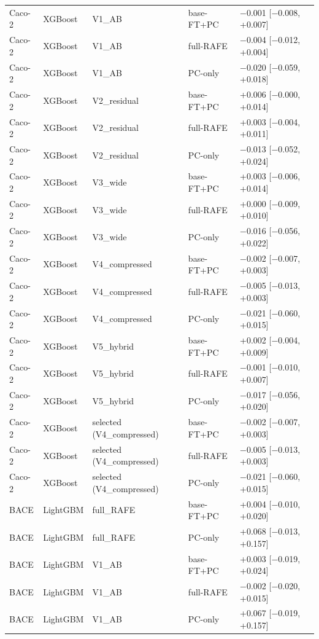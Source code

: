 \begin{longtable}{lllp{2.6cm}p{4.2cm}}
Caco-2 & XGBoost & V1\_AB & base-FT+PC & $-$0.001 [$-$0.008, +0.007] \\
Caco-2 & XGBoost & V1\_AB & full-RAFE & $-$0.004 [$-$0.012, +0.004] \\
Caco-2 & XGBoost & V1\_AB & PC-only & $-$0.020 [$-$0.059, +0.018] \\
Caco-2 & XGBoost & V2\_residual & base-FT+PC & +0.006 [$-$0.000, +0.014] \\
Caco-2 & XGBoost & V2\_residual & full-RAFE & +0.003 [$-$0.004, +0.011] \\
Caco-2 & XGBoost & V2\_residual & PC-only & $-$0.013 [$-$0.052, +0.024] \\
Caco-2 & XGBoost & V3\_wide & base-FT+PC & +0.003 [$-$0.006, +0.014] \\
Caco-2 & XGBoost & V3\_wide & full-RAFE & +0.000 [$-$0.009, +0.010] \\
Caco-2 & XGBoost & V3\_wide & PC-only & $-$0.016 [$-$0.056, +0.022] \\
Caco-2 & XGBoost & V4\_compressed & base-FT+PC & $-$0.002 [$-$0.007, +0.003] \\
Caco-2 & XGBoost & V4\_compressed & full-RAFE & $-$0.005 [$-$0.013, +0.003] \\
Caco-2 & XGBoost & V4\_compressed & PC-only & $-$0.021 [$-$0.060, +0.015] \\
Caco-2 & XGBoost & V5\_hybrid & base-FT+PC & +0.002 [$-$0.004, +0.009] \\
Caco-2 & XGBoost & V5\_hybrid & full-RAFE & $-$0.001 [$-$0.010, +0.007] \\
Caco-2 & XGBoost & V5\_hybrid & PC-only & $-$0.017 [$-$0.056, +0.020] \\
Caco-2 & XGBoost & selected (V4\_compressed) & base-FT+PC & $-$0.002 [$-$0.007, +0.003] \\
Caco-2 & XGBoost & selected (V4\_compressed) & full-RAFE & $-$0.005 [$-$0.013, +0.003] \\
Caco-2 & XGBoost & selected (V4\_compressed) & PC-only & $-$0.021 [$-$0.060, +0.015] \\
BACE & LightGBM & full\_RAFE & base-FT+PC & +0.004 [$-$0.010, +0.020] \\
BACE & LightGBM & full\_RAFE & PC-only & +0.068 [$-$0.013, +0.157] \\
BACE & LightGBM & V1\_AB & base-FT+PC & +0.003 [$-$0.019, +0.024] \\
BACE & LightGBM & V1\_AB & full-RAFE & $-$0.002 [$-$0.020, +0.015] \\
BACE & LightGBM & V1\_AB & PC-only & +0.067 [$-$0.019, +0.157] \\

\end{longtable}
